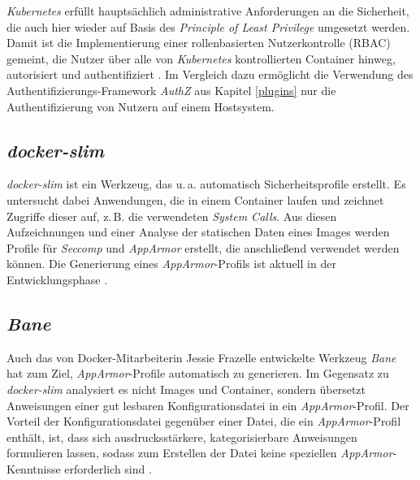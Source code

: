 \documentclass[../main.tex]{subfiles}
\begin{document}
      \emph{Kubernetes} erfüllt hauptsächlich administrative Anforderungen an die Sicherheit, die auch hier wieder auf Basis des \emph{Principle of Least Privilege} umgesetzt werden. Damit ist die Implementierung einer rollenbasierten Nutzerkontrolle (\acrshort{RBAC}) gemeint, die Nutzer über alle von \emph{Kubernetes} kontrollierten Container hinweg, autorisiert und authentifiziert \cite{githubKubernetesSecurity}. Im Vergleich dazu ermöglicht die Verwendung des Authentifizierungs-Framework \emph{AuthZ} aus Kapitel \ref{plugins} nur die Authentifizierung von Nutzern auf einem Hostsystem.



    \subsection{\emph{docker-slim}}
      \emph{docker-slim} ist ein Werkzeug, das u.\,a. automatisch Sicherheitsprofile erstellt. Es untersucht dabei Anwendungen, die in einem Container laufen und zeichnet Zugriffe dieser auf, z.\,B. die verwendeten \emph{System Calls}. Aus diesen Aufzeichnungen und einer Analyse der statischen Daten eines Images werden Profile für \emph{Seccomp} und \emph{AppArmor} erstellt, die anschließend verwendet werden können. Die Generierung eines \emph{AppArmor}-Profils ist aktuell in der Entwicklungsphase \cite{githubDockerSlim}.

    \subsection{\emph{Bane}}
      Auch das von Docker-Mitarbeiterin Jessie Frazelle entwickelte Werkzeug \emph{Bane} hat zum Ziel, \emph{AppArmor}-Profile automatisch zu generieren. Im Gegensatz zu \emph{docker-slim} analysiert es nicht Images und Container, sondern übersetzt Anweisungen einer gut lesbaren Konfigurationsdatei in ein \emph{AppArmor}-Profil. Der Vorteil der Konfigurationsdatei gegenüber einer Datei, die ein \emph{AppArmor}-Profil enthält, ist, dass sich ausdrucksstärkere, kategorisierbare Anweisungen formulieren lassen, sodass zum Erstellen der Datei keine speziellen \emph{AppArmor}-Kenntnisse erforderlich sind \cite{githubBane}.
\end{document}
